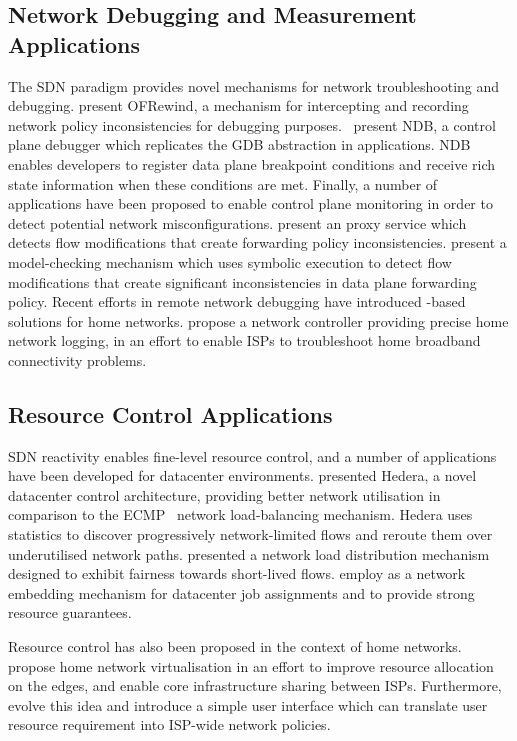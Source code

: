 \subsection{Network Debugging and Measurement Applications}

The SDN paradigm provides novel mechanisms for
network troubleshooting and debugging.  present OFRewind, a mechanism
for intercepting and recording network policy inconsistencies for debugging purposes.
~present NDB, a control plane debugger which replicates the
GDB abstraction in \of applications. NDB enables developers to register data
plane breakpoint conditions and receive rich state information when these
conditions are met.  Finally, a number of applications have been proposed to
enable control plane monitoring in order to detect potential network
misconfigurations.   present an \of proxy service which
detects flow modifications that create forwarding policy inconsistencies.
 present a model-checking mechanism which uses symbolic
execution to detect flow modifications that create significant inconsistencies
in data plane forwarding policy.  Recent efforts in remote network debugging have
introduced \of-based solutions for home networks.   propose a
network controller providing precise home network logging, in an effort to
enable ISPs to troubleshoot home broadband connectivity problems. 

\subsection{Resource Control Applications}

SDN reactivity enables fine-level resource control, and a number of applications
have been developed for datacenter environments.   presented
Hedera, a novel datacenter control architecture, providing better network
utilisation in comparison to the ECMP~ network load-balancing
mechanism. Hedera uses \of statistics to discover progressively
network-limited flows and reroute them over underutilised network paths.
 presented a network load distribution mechanism designed to
exhibit fairness towards short-lived flows.  employ \of as a
network embedding mechanism for datacenter job assignments and to provide strong
resource guarantees.

Resource control has also been proposed in the context of home networks.
 propose home network virtualisation in an effort to improve
resource allocation on the edges, and enable core infrastructure sharing between
ISPs.  Furthermore,  evolve this idea and introduce a simple
user interface which can translate user resource requirement into ISP-wide
network policies. 

